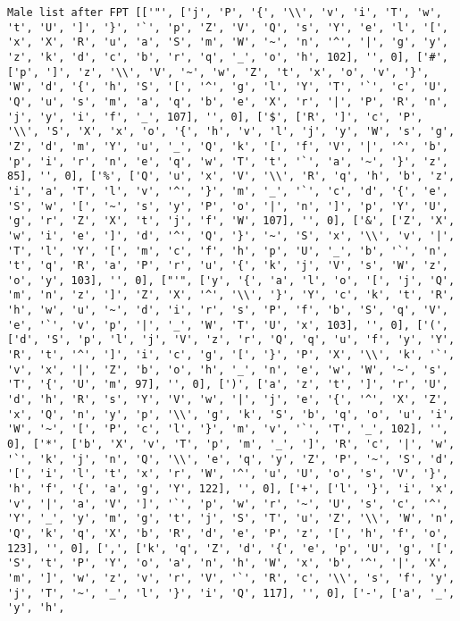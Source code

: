\documentclass{article}
\begin{document}
\begin{verbatim}
Male list after FPT [['"', ['j', 'P', '{', '\\', 'v', 'i', 'T', 'w', 't', 'U', ']', '}', '`', 'p', 'Z', 'V', 'Q', 's', 'Y', 'e', 'l', '[', 'x', 'X', 'R', 'u', 'a', 'S', 'm', 'W', '~', 'n', '^', '|', 'g', 'y', 'z', 'k', 'd', 'c', 'b', 'r', 'q', '_', 'o', 'h', 102], '', 0], ['#', ['p', ']', 'z', '\\', 'V', '~', 'w', 'Z', 't', 'x', 'o', 'v', '}', 'W', 'd', '{', 'h', 'S', '[', '^', 'g', 'l', 'Y', 'T', '`', 'c', 'U', 'Q', 'u', 's', 'm', 'a', 'q', 'b', 'e', 'X', 'r', '|', 'P', 'R', 'n', 'j', 'y', 'i', 'f', '_', 107], '', 0], ['$', ['R', ']', 'c', 'P', '\\', 'S', 'X', 'x', 'o', '{', 'h', 'v', 'l', 'j', 'y', 'W', 's', 'g', 'Z', 'd', 'm', 'Y', 'u', '_', 'Q', 'k', '[', 'f', 'V', '|', '^', 'b', 'p', 'i', 'r', 'n', 'e', 'q', 'w', 'T', 't', '`', 'a', '~', '}', 'z', 85], '', 0], ['%', ['Q', 'u', 'x', 'V', '\\', 'R', 'q', 'h', 'b', 'z', 'i', 'a', 'T', 'l', 'v', '^', '}', 'm', '_', '`', 'c', 'd', '{', 'e', 'S', 'w', '[', '~', 's', 'y', 'P', 'o', '|', 'n', ']', 'p', 'Y', 'U', 'g', 'r', 'Z', 'X', 't', 'j', 'f', 'W', 107], '', 0], ['&', ['Z', 'X', 'w', 'i', 'e', ']', 'd', '^', 'Q', '}', '~', 'S', 'x', '\\', 'v', '|', 'T', 'l', 'Y', '[', 'm', 'c', 'f', 'h', 'p', 'U', '_', 'b', '`', 'n', 't', 'q', 'R', 'a', 'P', 'r', 'u', '{', 'k', 'j', 'V', 's', 'W', 'z', 'o', 'y', 103], '', 0], ["'", ['y', '{', 'a', 'l', 'o', '[', 'j', 'Q', 'm', 'n', 'z', ']', 'Z', 'X', '^', '\\', '}', 'Y', 'c', 'k', 't', 'R', 'h', 'w', 'u', '~', 'd', 'i', 'r', 's', 'P', 'f', 'b', 'S', 'q', 'V', 'e', '`', 'v', 'p', '|', '_', 'W', 'T', 'U', 'x', 103], '', 0], ['(', ['d', 'S', 'p', 'l', 'j', 'V', 'z', 'r', 'Q', 'q', 'u', 'f', 'y', 'Y', 'R', 't', '^', ']', 'i', 'c', 'g', '[', '}', 'P', 'X', '\\', 'k', '`', 'v', 'x', '|', 'Z', 'b', 'o', 'h', '_', 'n', 'e', 'w', 'W', '~', 's', 'T', '{', 'U', 'm', 97], '', 0], [')', ['a', 'z', 't', ']', 'r', 'U', 'd', 'h', 'R', 's', 'Y', 'V', 'w', '|', 'j', 'e', '{', '^', 'X', 'Z', 'x', 'Q', 'n', 'y', 'p', '\\', 'g', 'k', 'S', 'b', 'q', 'o', 'u', 'i', 'W', '~', '[', 'P', 'c', 'l', '}', 'm', 'v', '`', 'T', '_', 102], '', 0], ['*', ['b', 'X', 'v', 'T', 'p', 'm', '_', ']', 'R', 'c', '|', 'w', '`', 'k', 'j', 'n', 'Q', '\\', 'e', 'q', 'y', 'Z', 'P', '~', 'S', 'd', '[', 'i', 'l', 't', 'x', 'r', 'W', '^', 'u', 'U', 'o', 's', 'V', '}', 'h', 'f', '{', 'a', 'g', 'Y', 122], '', 0], ['+', ['l', '}', 'i', 'x', 'v', '|', 'a', 'V', ']', '`', 'p', 'w', 'r', '~', 'U', 's', 'c', '^', 'Y', '_', 'y', 'm', 'g', 't', 'j', 'S', 'T', 'u', 'Z', '\\', 'W', 'n', 'Q', 'k', 'q', 'X', 'b', 'R', 'd', 'e', 'P', 'z', '[', 'h', 'f', 'o', 123], '', 0], [',', ['k', 'q', 'Z', 'd', '{', 'e', 'p', 'U', 'g', '[', 'S', 't', 'P', 'Y', 'o', 'a', 'n', 'h', 'W', 'x', 'b', '^', '|', 'X', 'm', ']', 'w', 'z', 'v', 'r', 'V', '`', 'R', 'c', '\\', 's', 'f', 'y', 'j', 'T', '~', '_', 'l', '}', 'i', 'Q', 117], '', 0], ['-', ['a', '_', 'y', 'h', 
\end{verbatim}
\end{document}
